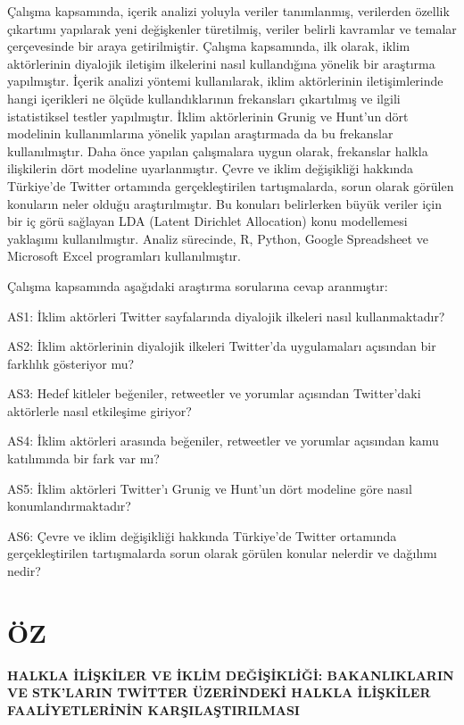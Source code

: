 \documentclass[
]{book}
\begin{document}
Çalışma kapsamında, içerik analizi \citep{yildirim2018sosyal} yoluyla veriler tanımlanmış, verilerden özellik çıkartımı yapılarak yeni değişkenler türetilmiş, veriler belirli kavramlar ve temalar çerçevesinde bir araya getirilmiştir. Çalışma kapsamında, ilk olarak, iklim aktörlerinin diyalojik iletişim ilkelerini nasıl kullandığına yönelik bir araştırma yapılmıştır. İçerik analizi yöntemi kullanılarak, iklim aktörlerinin iletişimlerinde hangi içerikleri ne ölçüde kullandıklarının frekansları çıkartılmış ve ilgili istatistiksel testler yapılmıştır. İklim aktörlerinin Grunig ve Hunt'un dört modelinin kullanımlarına yönelik yapılan araştırmada da bu frekanslar kullanılmıştır. Daha önce yapılan çalışmalara uygun olarak, frekanslar halkla ilişkilerin dört modeline uyarlanmıştır. Çevre ve iklim değişikliği hakkında Türkiye'de Twitter ortamında gerçekleştirilen tartışmalarda, sorun olarak görülen konuların neler olduğu araştırılmıştır. Bu konuları belirlerken büyük veriler için bir iç görü sağlayan LDA (Latent Dirichlet Allocation) konu modellemesi yaklaşımı kullanılmıştır. Analiz sürecinde, R, Python, Google Spreadsheet ve Microsoft Excel programları kullanılmıştır.

Çalışma kapsamında aşağıdaki araştırma sorularına cevap aranmıştır:

AS1: İklim aktörleri Twitter sayfalarında diyalojik ilkeleri nasıl kullanmaktadır?

AS2: İklim aktörlerinin diyalojik ilkeleri Twitter'da uygulamaları açısından bir farklılık gösteriyor mu?

AS3: Hedef kitleler beğeniler, retweetler ve yorumlar açısından Twitter'daki aktörlerle nasıl etkileşime giriyor?

AS4: İklim aktörleri arasında beğeniler, retweetler ve yorumlar açısından kamu katılımında bir fark var mı?

AS5: İklim aktörleri Twitter'ı Grunig ve Hunt'un dört modeline göre nasıl konumlandırmaktadır?

AS6: Çevre ve iklim değişikliği hakkında Türkiye'de Twitter ortamında gerçekleştirilen tartışmalarda sorun olarak görülen konular nelerdir ve dağılımı nedir?

\hypertarget{uxf6z}{%
\chapter*{ÖZ}\label{uxf6z}}

\textbf{HALKLA İLİŞKİLER VE İKLİM DEĞİŞİKLİĞİ: BAKANLIKLARIN VE STK'LARIN TWİTTER ÜZERİNDEKİ HALKLA İLİŞKİLER FAALİYETLERİNİN KARŞILAŞTIRILMASI}
\end{document}
